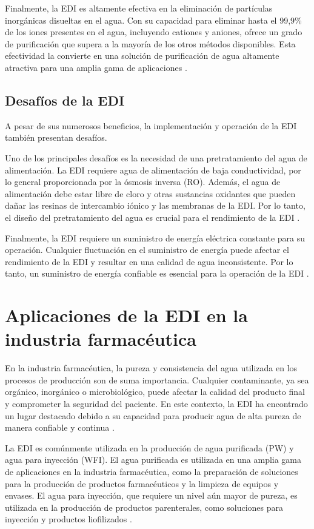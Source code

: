 Finalmente, la EDI es altamente efectiva en la eliminación de partículas inorgánicas disueltas en el agua. Con su capacidad
para eliminar hasta el 99,9\% de los iones presentes en el agua, incluyendo cationes y aniones, ofrece un grado de purificación
que supera a la mayoría de los otros métodos disponibles. Esta efectividad la convierte en una solución de purificación de
agua altamente atractiva para una amplia gama de aplicaciones \cite{lenntechElectrodeionizationEDI}.

\subsection{Desafíos de la EDI}
A pesar de sus numerosos beneficios, la implementación y operación de la EDI también presentan desafíos.

Uno de los principales desafíos es la necesidad de una pretratamiento del agua de alimentación. La EDI requiere agua de alimentación
de baja conductividad, por lo general proporcionada por la ósmosis inversa (RO). Además, el agua de alimentación debe estar libre
de cloro y otras sustancias oxidantes que pueden dañar las resinas de intercambio iónico y las membranas de la EDI. Por lo tanto,
el diseño del pretratamiento del agua es crucial para el rendimiento de la EDI \cite{lenntechElectrodeionizationEDI}.

Finalmente, la EDI requiere un suministro de energía eléctrica constante para su operación. Cualquier fluctuación en el suministro
de energía puede afectar el rendimiento de la EDI y resultar en una calidad de agua inconsistente. Por lo tanto, un suministro de
energía confiable es esencial para la operación de la EDI \cite{lenntechElectrodeionizationEDI}.

\section{Aplicaciones de la EDI en la industria farmacéutica}
En la industria farmacéutica, la pureza y consistencia del agua utilizada en los procesos de producción son de suma importancia.
Cualquier contaminante, ya sea orgánico, inorgánico o microbiológico, puede afectar la calidad del producto final y comprometer la
seguridad del paciente. En este contexto, la EDI ha encontrado un lugar destacado debido a su capacidad para producir agua de alta
pureza de manera confiable y continua \cite{condorchemUltrapureWaterElectrodeionization2019}.

La EDI es comúnmente utilizada en la producción de agua purificada (PW) y agua para inyección (WFI). El agua purificada es utilizada
en una amplia gama de aplicaciones en la industria farmacéutica, como la preparación de soluciones para la producción de productos
farmacéuticos y la limpieza de equipos y envases. El agua para inyección, que requiere un nivel aún mayor de pureza, es utilizada
en la producción de productos parenterales, como soluciones para inyección y productos liofilizados \cite{condorchemUltrapureWaterElectrodeionization2019}.

